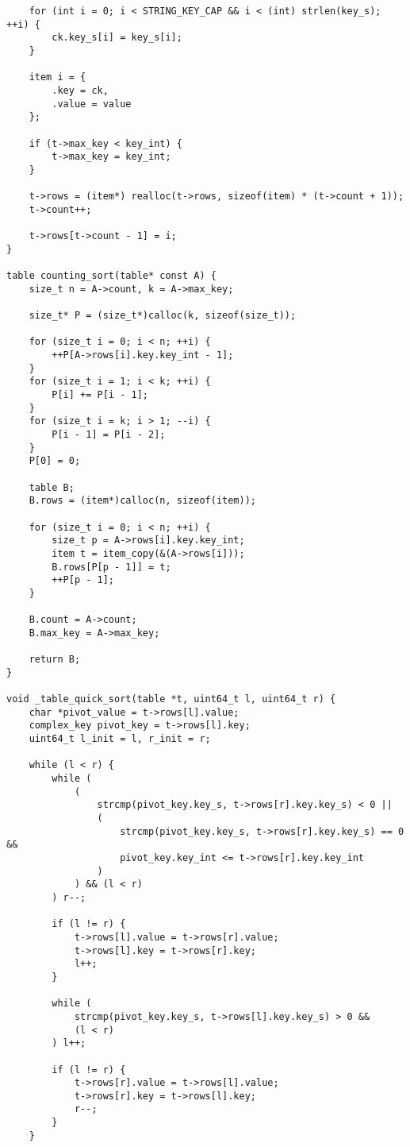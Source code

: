 \documentclass[a4paper]{article}
\newcounter{i}
\begin{document}
\begin{enumerate}[label=\textbf{\arabic*}.]
\begin{verbatim}
    for (int i = 0; i < STRING_KEY_CAP && i < (int) strlen(key_s); ++i) {
        ck.key_s[i] = key_s[i];
    }

    item i = {
        .key = ck,
        .value = value
    };

    if (t->max_key < key_int) {
        t->max_key = key_int;
    }

    t->rows = (item*) realloc(t->rows, sizeof(item) * (t->count + 1));
    t->count++;

    t->rows[t->count - 1] = i;
}

table counting_sort(table* const A) {
    size_t n = A->count, k = A->max_key;

    size_t* P = (size_t*)calloc(k, sizeof(size_t));

    for (size_t i = 0; i < n; ++i) {
        ++P[A->rows[i].key.key_int - 1];
    }
    for (size_t i = 1; i < k; ++i) {
        P[i] += P[i - 1];
    }
    for (size_t i = k; i > 1; --i) {
        P[i - 1] = P[i - 2];
    }
    P[0] = 0;

    table B;
    B.rows = (item*)calloc(n, sizeof(item));

    for (size_t i = 0; i < n; ++i) {
        size_t p = A->rows[i].key.key_int;
        item t = item_copy(&(A->rows[i]));
        B.rows[P[p - 1]] = t;
        ++P[p - 1];
    }

    B.count = A->count;
    B.max_key = A->max_key;

    return B;
}

void _table_quick_sort(table *t, uint64_t l, uint64_t r) {
    char *pivot_value = t->rows[l].value;
    complex_key pivot_key = t->rows[l].key;
    uint64_t l_init = l, r_init = r;

    while (l < r) {
        while (
            (
                strcmp(pivot_key.key_s, t->rows[r].key.key_s) < 0 ||
                (
                    strcmp(pivot_key.key_s, t->rows[r].key.key_s) == 0 &&
                    pivot_key.key_int <= t->rows[r].key.key_int
                )
            ) && (l < r)
        ) r--;

        if (l != r) {
            t->rows[l].value = t->rows[r].value;
            t->rows[l].key = t->rows[r].key;
            l++;
        }

        while (
            strcmp(pivot_key.key_s, t->rows[l].key.key_s) > 0 &&
            (l < r)
        ) l++;

        if (l != r) {
            t->rows[r].value = t->rows[l].value;
            t->rows[r].key = t->rows[l].key;
            r--;
        }
    }


\end{verbatim}
\end{enumerate}
\end{document}
